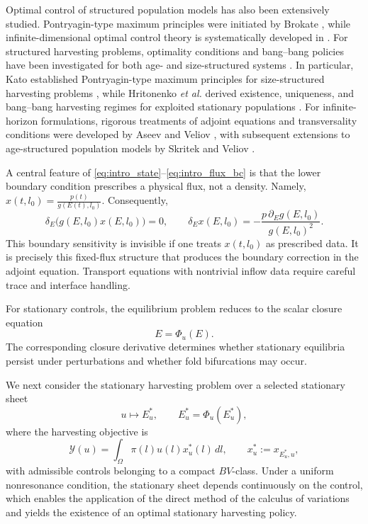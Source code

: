 \documentclass[a4paper,fleqn,longmktitle]{cas-sc}
\theoremstyle{plain}
\theoremstyle{definition}
\theoremstyle{remark}
\numberwithin{equation}{section}
\begin{document}
Optimal control of structured population models has also been extensively
studied.
Pontryagin-type maximum principles were initiated by
Brokate \cite{brokate1985pontryagin,wang2026elliptic},
while infinite-dimensional optimal control theory is systematically developed
in
\cite{li2012optimal,anita2013analysis,wang2025multi}.
For structured harvesting problems, optimality conditions and bang--bang
policies have been investigated for both age- and size-structured systems
\cite{feichtinger2003optimality,park1998optimal,barbu1999optimal,
kato2008maximum,liu2025optimal,gao2022rolling}.
In particular, Kato established Pontryagin-type maximum principles for
size-structured harvesting problems \cite{kato2008maximum}, while
Hritonenko \emph{et al.}
derived existence, uniqueness, and bang--bang harvesting regimes for exploited
stationary populations
\cite{hritonenko2008maximum,hritonenko2009bang}.
For infinite-horizon formulations, rigorous treatments of adjoint equations and
transversality conditions were developed by
Aseev and Veliov \cite{aseev2012maximum},
with subsequent extensions to age-structured population models by
Skritek and Veliov \cite{skritek2015infinite}.

A central feature of \eqref{eq:intro_state}--\eqref{eq:intro_flux_bc} is that
the lower boundary condition prescribes a physical flux, not a density. Namely,
$\displaystyle x(t,l_0)=\frac{p(t)}{g(E(t),l_0)}$.
Consequently,
\[
    \delta_E\big(g(E,l_0)x(E,l_0)\big)=0,
    \qquad
    \delta_E x(E,l_0)
    =
    -\frac{p\,\partial_Eg(E,l_0)}{g(E,l_0)^2}.
\]
This boundary sensitivity is invisible if one treats \(x(t,l_0)\) as prescribed
data. It is precisely this fixed-flux structure that produces the boundary
correction in the adjoint equation. 
Transport equations with nontrivial inflow
data require careful trace and interface handling.

For stationary controls,
the equilibrium problem reduces to the scalar closure equation
\[
E=\Phi_u(E).
\]
The corresponding closure derivative determines whether stationary
equilibria persist under perturbations and whether fold bifurcations may
occur.

We next consider the stationary harvesting problem over a selected stationary
sheet
\[
u\longmapsto E_u^*,
\qquad
E_u^*=\Phi_u(E_u^*),
\]
where the harvesting objective is
\[
\mathcal Y(u)
=
\int_\Omega \pi(l)u(l)x_u^*(l)\,dl,
\qquad
x_u^*:=x_{E_u^*,u},
\]
with admissible controls belonging to a compact \(BV\)-class.
Under a uniform nonresonance condition, the stationary sheet depends
continuously on the control, which enables the application of the direct
method of the calculus of variations and yields the existence of an optimal
stationary harvesting policy.
\end{document}
